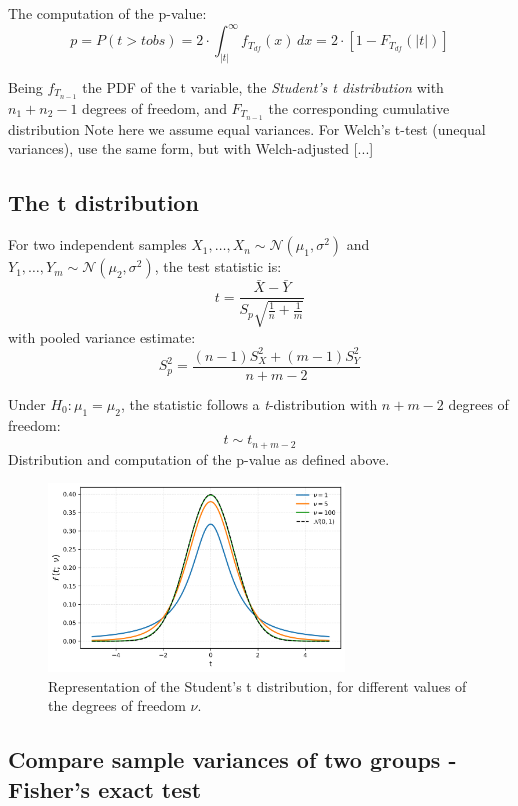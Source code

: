 \documentclass{book}
\begin{document}
The computation of the p-value:
\begin{equation}
	p = P\left(t > t obs \right) = 2 \cdot \int_{|t|}^{\infty} f_{T_{df}}(x)\,dx = 2 \cdot \left[1 - F_{T_{df}}(|t|)\right]
\end{equation}

Being $f_{T_{n-1}}$ the PDF of the t variable, the \textit{Student's t distribution} with $n_1 + n_2 - 1$ degrees of freedom, and $F_{T_{n-1}}$ the corresponding cumulative distribution
Note here we assume equal variances. For Welch’s t-test (unequal variances), use the same form, but with Welch-adjusted [...]

\subsection*{The t distribution}

For two independent samples \( X_1, \ldots, X_n \sim \mathcal{N}(\mu_1, \sigma^2) \) and \( Y_1, \ldots, Y_m \sim \mathcal{N}(\mu_2, \sigma^2) \), the test statistic is:
\[
t = \frac{\bar{X} - \bar{Y}}{S_p \sqrt{\frac{1}{n} + \frac{1}{m}}}
\]
with pooled variance estimate:
\[
S_p^2 = \frac{(n-1)S_X^2 + (m-1)S_Y^2}{n + m - 2}
\]

Under \( H_0: \mu_1 = \mu_2 \), the statistic follows a \textit{t}-distribution with \( n + m - 2 \) degrees of freedom:
\[
t \sim t_{n+m-2}
\]
Distribution and computation of the p-value as defined above.

\begin{figure}[ht]
    \centering
    \includegraphics[width=0.7\textwidth]{figures/chapter4/t_distribution.png}
    \caption{Representation of the Student's t distribution, for different values of the degrees of freedom $\nu$.}
    \label{fig:t_distribution}
\end{figure}

\newpage

\subsection{Compare sample variances of two groups - Fisher's exact test}
\end{document}
